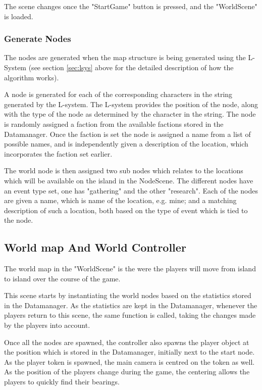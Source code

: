 The scene changes once the "StartGame" button is pressed, and the "WorldScene" is loaded.

\subsubsection{Generate Nodes}
The nodes are generated when the map structure is being generated using the L-System (see section \ref{sec:lsys} above for the detailed description of how the algorithm works).

A node is generated for each of the corresponding characters in the string generated by the L-system.
The L-system provides the position of the node, along with the type of the node as determined by the character in the string. 
The node is randomly assigned a faction from the available factions stored in the Datamanager. Once the faction is set the node is assigned a name from a list of possible names, and is independently given a description of the location, which incorporates the faction set earlier.

The world node is then assigned two sub nodes which relates to the locations which will be available on the island in the NodeScene. The different nodes have an event type set, one has "gathering" and the other "research".
Each of the nodes are given a name, which is name of the location, e.g. mine; and a matching description of such a location, both based on the type of event which is tied to the node.

\subsection{World map And World Controller}
The world map in the "WorldScene" is the were the players will move from island to island over the course of the game. 

This scene starts by instantiating the world nodes based on the statistics stored in the Datamanager. As the statistics are kept in the Datamanager, whenever the players return to this scene, the same function is called, taking the changes made by the players into account. 

Once all the nodes are spawned, the controller also spawns the player object at the position which is stored in the Datamanager, initially next to the start node. 
As the player token is spawned, the main camera is centred on the token as well. As the position of the players change during the game, the centering allows the players to quickly find their bearings.

